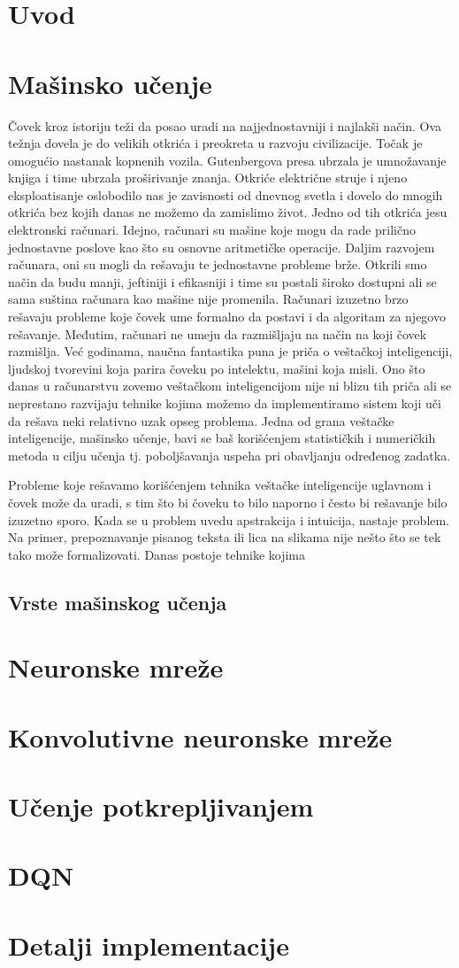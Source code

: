 \documentclass{article}
\begin{document}
\section{Uvod}
\section{Mašinsko učenje}

Čovek kroz istoriju teži da posao uradi na najjednostavniji i najlakši način. Ova težnja dovela je do velikih otkrića i preokreta u razvoju civilizacije. Točak je omogućio nastanak kopnenih vozila. Gutenbergova presa ubrzala je umnožavanje knjiga i time ubrzala proširivanje znanja. Otkriće električne struje i njeno eksploatisanje oslobodilo nas je zavisnosti od dnevnog svetla i dovelo do mnogih otkrića bez kojih danas ne možemo da zamislimo život. Jedno od tih otkrića jesu elektronski računari. Idejno, računari su mašine koje mogu da rade prilično jednostavne poslove kao što su osnovne aritmetičke operacije. Daljim razvojem računara, oni su mogli da rešavaju te jednostavne probleme brže. Otkrili smo način da budu manji, jeftiniji i efikasniji i time su postali široko dostupni ali se sama suština računara kao mašine nije promenila. Računari izuzetno brzo rešavaju probleme koje čovek ume formalno da postavi i da algoritam za njegovo rešavanje. Međutim, računari ne umeju da razmišljaju na način na koji čovek razmišlja. Već godinama, naučna fantastika puna je priča o veštačkoj inteligenciji, ljudskoj tvorevini koja parira čoveku po intelektu, mašini koja misli. Ono što danas u računarstvu zovemo veštačkom inteligencijom nije ni blizu tih priča ali se neprestano razvijaju tehnike kojima možemo da implementiramo sistem koji uči da rešava neki relativno uzak opseg problema. 
Jedna od grana veštačke inteligencije, mašinsko učenje, bavi se baš korišćenjem statističkih i numeričkih metoda u cilju učenja tj. poboljšavanja uspeha pri obavljanju određenog zadatka. 

Probleme koje rešavamo korišćenjem tehnika veštačke inteligencije uglavnom i čovek može da uradi, s tim što bi čoveku to bilo naporno i često bi rešavanje bilo izuzetno sporo.
Kada se u problem uvedu apstrakcija i intuicija, nastaje problem. Na primer, prepoznavanje pisanog teksta ili lica na slikama nije nešto što se tek tako može formalizovati. 
Danas postoje tehnike kojima 



\subsection{Vrste mašinskog učenja}

\section{Neuronske mreže}
\section{Konvolutivne neuronske mreže}
\section{Učenje potkrepljivanjem}
\section{DQN}
\section{Detalji implementacije}
\end{document}
